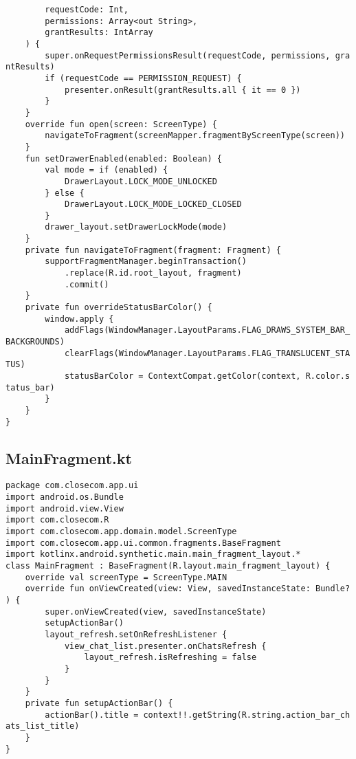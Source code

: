 \documentclass[listing]{espd}
\begin{document}
\begin{verbatim}
        requestCode: Int,
        permissions: Array<out String>,
        grantResults: IntArray
    ) {
        super.onRequestPermissionsResult(requestCode, permissions, gra
ntResults)
        if (requestCode == PERMISSION_REQUEST) {
            presenter.onResult(grantResults.all { it == 0 })
        }
    }
    override fun open(screen: ScreenType) {
        navigateToFragment(screenMapper.fragmentByScreenType(screen))
    }
    fun setDrawerEnabled(enabled: Boolean) {
        val mode = if (enabled) {
            DrawerLayout.LOCK_MODE_UNLOCKED
        } else {
            DrawerLayout.LOCK_MODE_LOCKED_CLOSED
        }
        drawer_layout.setDrawerLockMode(mode)
    }
    private fun navigateToFragment(fragment: Fragment) {
        supportFragmentManager.beginTransaction()
            .replace(R.id.root_layout, fragment)
            .commit()
    }
    private fun overrideStatusBarColor() {
        window.apply {
            addFlags(WindowManager.LayoutParams.FLAG_DRAWS_SYSTEM_BAR_
BACKGROUNDS)
            clearFlags(WindowManager.LayoutParams.FLAG_TRANSLUCENT_STA
TUS)
            statusBarColor = ContextCompat.getColor(context, R.color.s
tatus_bar)
        }
    }
}
\end{verbatim}

\subsection{MainFragment.kt}
\begin{verbatim}
package com.closecom.app.ui
import android.os.Bundle
import android.view.View
import com.closecom.R
import com.closecom.app.domain.model.ScreenType
import com.closecom.app.ui.common.fragments.BaseFragment
import kotlinx.android.synthetic.main.main_fragment_layout.*
class MainFragment : BaseFragment(R.layout.main_fragment_layout) {
    override val screenType = ScreenType.MAIN
    override fun onViewCreated(view: View, savedInstanceState: Bundle?
) {
        super.onViewCreated(view, savedInstanceState)
        setupActionBar()
        layout_refresh.setOnRefreshListener {
            view_chat_list.presenter.onChatsRefresh {
                layout_refresh.isRefreshing = false
            }
        }
    }
    private fun setupActionBar() {
        actionBar().title = context!!.getString(R.string.action_bar_ch
ats_list_title)
    }
}
\end{verbatim}
\end{document}
